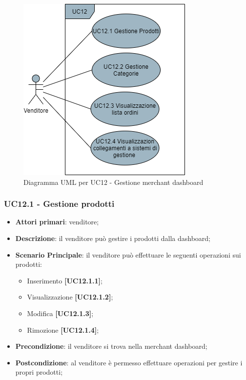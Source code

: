 \begin{figure}[H]
\centering
\includegraphics[scale=0.6]{res/UseCase/Immagini/MerchantDashboard}
\caption{Diagramma UML per UC12 - Gestione merchant dashboard}
\end{figure}

\subsubsection{UC12.1 - Gestione prodotti}
\begin{itemize}
\item \textbf{Attori primari}: venditore;
\item \textbf{Descrizione}: il venditore può gestire i prodotti dalla dashboard;
\item \textbf{Scenario Principale}: il venditore può effettuare le seguenti operazioni sui prodotti:
\begin{itemize}
	\item Inserimento \textbf{[UC12.1.1]};
	\item Visualizzazione \textbf{[UC12.1.2]};
	\item Modifica \textbf{[UC12.1.3]};
	\item Rimozione \textbf{[UC12.1.4]};
\end{itemize}
\item \textbf{Precondizione}: il venditore si trova nella merchant dashboard;
\item \textbf{Postcondizione}: al venditore è permesso effettuare operazioni per gestire i propri prodotti;
\end{itemize}

